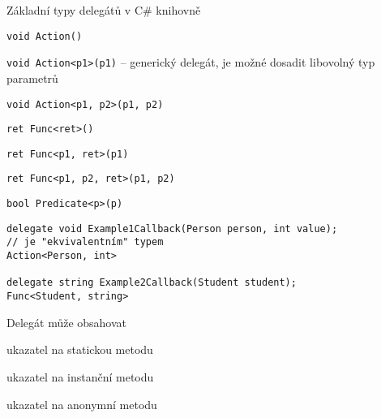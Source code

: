 \begin{frame}[fragile]
\begin{bitemize}{Základní typy delegátů v C\# knihovně}
\item \lstinline|void Action()|
\item \lstinline|void Action<p1>(p1)| -- generický delegát, je možné dosadit libovolný typ parametrů
\item \lstinline|void Action<p1, p2>(p1, p2)|
\item \lstinline|ret Func<ret>()|
\item \lstinline|ret Func<p1, ret>(p1)|
\item \lstinline|ret Func<p1, p2, ret>(p1, p2)|
\item \lstinline|bool Predicate<p>(p)|
\end{bitemize}

\vfill

\begin{yesblock}
\begin{lstlisting}
delegate void Example1Callback(Person person, int value);
// je "ekvivalentním" typem
Action<Person, int>

delegate string Example2Callback(Student student);
Func<Student, string>
\end{lstlisting}
\end{yesblock}
\end{frame}





\begin{frame}[fragile]
\begin{bitemize}{Delegát může obsahovat}
\item ukazatel na statickou metodu
\item ukazatel na instanční metodu
\item ukazatel na anonymní metodu
\end{bitemize}
\end{frame}






